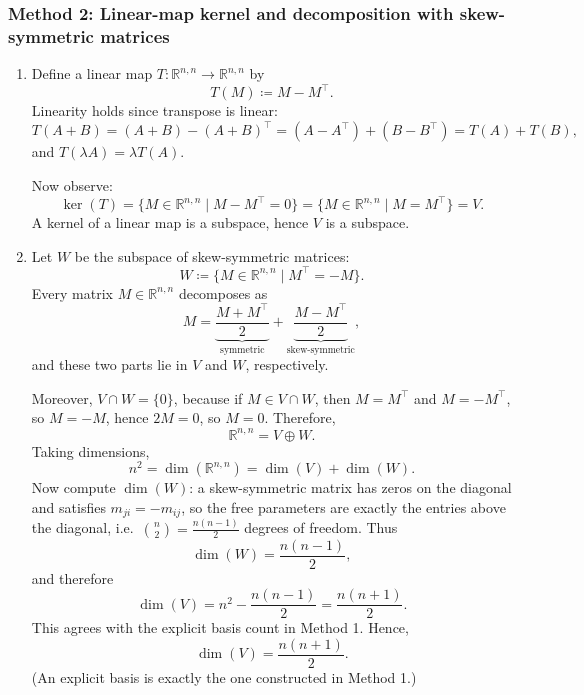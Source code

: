 \documentclass[12pt]{article}
\newcommand{\R}{\mathbb{R}}
\begin{document}
\subsubsection{Method 2: Linear-map kernel and decomposition with skew-symmetric matrices}
\begin{enumerate}[label=(\alph*)]
\item Define a linear map \(T:\R^{n,n}\to \R^{n,n}\) by
\[
T(M)\coloneqq M-M^\top.
\]
Linearity holds since transpose is linear:
\[
T(A+B)=(A+B)-(A+B)^\top=(A-A^\top)+(B-B^\top)=T(A)+T(B),
\]
and \(T(\lambda A)=\lambda T(A)\).

Now observe:
\[
\ker(T)=\{M\in\R^{n,n}\mid M-M^\top=0\}=\{M\in\R^{n,n}\mid M=M^\top\}=V.
\]
A kernel of a linear map is a subspace, hence \(V\) is a subspace.

\item Let \(W\) be the subspace of skew-symmetric matrices:
\[
W\coloneqq \{M\in\R^{n,n}\mid M^\top=-M\}.
\]
Every matrix \(M\in\R^{n,n}\) decomposes as
\[
M=\underbrace{\frac{M+M^\top}{2}}_{\text{symmetric}}+\underbrace{\frac{M-M^\top}{2}}_{\text{skew-symmetric}},
\]
and these two parts lie in \(V\) and \(W\), respectively.

Moreover, \(V\cap W=\{0\}\), because if \(M\in V\cap W\), then \(M=M^\top\) and \(M=-M^\top\), so \(M=-M\), hence \(2M=0\), so \(M=0\).
Therefore,
\[
\R^{n,n}=V\oplus W.
\]
Taking dimensions,
\[
n^2=\dim(\R^{n,n})=\dim(V)+\dim(W).
\]
Now compute \(\dim(W)\): a skew-symmetric matrix has zeros on the diagonal and satisfies \(m_{ji}=-m_{ij}\), so the free parameters are exactly the entries above the diagonal, i.e.\ \(\binom{n}{2}=\frac{n(n-1)}{2}\) degrees of freedom.
Thus
\[
\dim(W)=\frac{n(n-1)}{2},
\]
and therefore
\[
\dim(V)=n^2-\frac{n(n-1)}{2}=\frac{n(n+1)}{2}.
\]
This agrees with the explicit basis count in Method 1.
Hence,
\[
\boxed{\,\dim(V)=\frac{n(n+1)}{2}.\,}
\]
(An explicit basis is exactly the one constructed in Method 1.)
\end{enumerate}
\end{document}
